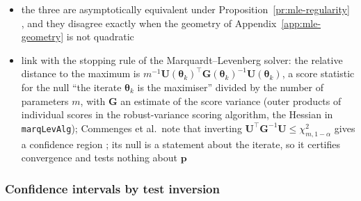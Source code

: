 \begin{itemize}
        and the Lagrange-multiplier test are the same statistic, since the multiplier of \(\boldsymbol{\psi}=\boldsymbol{\psi}_{0}\) at
        the restricted maximum equals \(\boldsymbol{U}_{\psi}(\tilde{\boldsymbol{\theta}}_{0})\); written in \(\boldsymbol{p}\) coordinates it is
        defined on a face, where Wald is not
  \item the three are asymptotically equivalent under Proposition~\ref{pr:mle-regularity}
        \cite[Sect.~9.3]{coxTheoreticalStatistics1979}, and they disagree exactly when the geometry of
        Appendix~\ref{app:mle-geometry} is not quadratic
  \item link with the stopping rule of the Marquardt--Levenberg solver: the relative distance to the
        maximum is \(m^{-1}\boldsymbol{U}(\boldsymbol{\theta}_{k})^{\top}\boldsymbol{G}(\boldsymbol{\theta}_{k})^{-1}\boldsymbol{U}(\boldsymbol{\theta}_{k})\), a score statistic for the null
        ``the iterate \(\boldsymbol{\theta}_{k}\) is the maximiser'' divided by the number of parameters \(m\), with
        \(\boldsymbol{G}\) an estimate of the score variance (outer products of individual scores in the robust-variance
        scoring algorithm, the Hessian in \texttt{marqLevAlg}); Commenges et al.\ note that inverting
        \(\boldsymbol{U}^{\top}\boldsymbol{G}^{-1}\boldsymbol{U}\le\chi^{2}_{m,1-\alpha}\) gives a confidence region
        \cite[pp.~10 and 13]{commengesNewtonLikeAlgorithmLikelihood2006}; its null is a statement about the
        iterate, so it certifies convergence and tests nothing about \(\boldsymbol{p}\)
\end{itemize}

\subsubsection{Confidence intervals by test inversion}
\label{app:mle-inversion}

